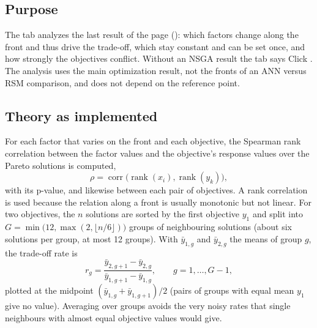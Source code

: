 \subsection{Purpose}
The tab  analyzes the last result of the  page (): which factors change along the front and thus drive the trade-off, which stay constant and can be
set once, and how strongly the objectives conflict. Without an NSGA result the tab says  Click . The analysis uses the main optimization result, not the
fronts of an ANN versus RSM comparison, and does not depend on the reference point.

\subsection{Theory as implemented}
For each factor that varies on the front and each objective, the Spearman rank correlation \citep{spearman1904}
between the factor values and the objective's response values over the Pareto solutions is computed,
\begin{equation}
\rho=\operatorname{corr}\bigl(\operatorname{rank}(x_i),\operatorname{rank}(y_k)\bigr),
\label{eq:ch09-spearman}
\end{equation}
with its p-value, and likewise between each pair of objectives. A rank correlation is used because the relation along
a front is usually monotonic but not linear. For two objectives, the $n$ solutions are sorted by the first objective
$y_1$ and split into $G=\min\bigl(12,\max(2,\lfloor n/6\rfloor)\bigr)$ groups of neighbouring solutions (about six
solutions per group, at most 12 groups). With $\bar y_{1,g}$ and $\bar y_{2,g}$ the means of group $g$, the trade-off
rate is
\begin{equation}
r_g=\frac{\bar y_{2,g+1}-\bar y_{2,g}}{\bar y_{1,g+1}-\bar y_{1,g}},\qquad g=1,\dots,G-1,
\label{eq:ch09-rate}
\end{equation}
plotted at the midpoint $(\bar y_{1,g}+\bar y_{1,g+1})/2$ (pairs of groups with equal mean $y_1$ give no value).
Averaging over groups avoids the very noisy rates that single neighbours with almost equal objective values would
give.

